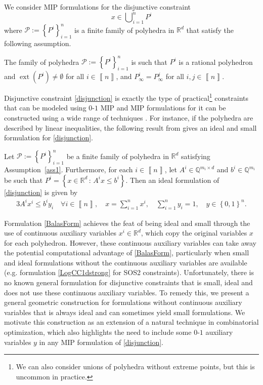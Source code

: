 \documentclass[mnsc]{informs3}
\newcommand{\set}[1]{\left\{#1\right\}}                     %
\newcommand{\bra}[1]{\left(#1\right)}
\newcommand{\sidx}[1]{\left\llbracket     #1 \right\rrbracket}
\newcommand{\Real}{\mathbb R}
\DeclareMathOperator{\ext}{ext}
\begin{document}
We consider MIP formulations for the disjunctive constraint \begin{equation}\label{disjunction}
x\in \bigcup\nolimits_{i=1}^n P^i
\end{equation}
where $\mathcal{P}:=\set{P^i}_{i=1}^n$ is a finite family of polyhedra in $\Real^d$ that satisfy the following assumption.
\begin{assumption}\label{ass1}The family of polyhedra $\mathcal{P}:=\set{P^i}_{i=1}^n$ is such that  $P^i$ is a rational polyhedron and $\ext\bra{P^i}\neq \emptyset$ for all $i\in \sidx{n}$, and 
 $P^i_\infty=P^j_\infty$ for all $i,j\in \sidx{n}$.
\end{assumption}
Disjunctive constraint \eqref{disjunction} is exactly the type of practical\footnote{We can also consider unions of polyhedra without extreme points, but this is uncommon in practice.} constraints that can be modeled using $0$-$1$ MIP \citep{springerlink:10.1007/BFb0121015} and MIP formulations for it can be constructed using a wide range of techniques \citep{Mixed-Integer-Linear-Programming-Formulation-Techniques}.
For instance, if the polyhedra are described by linear inequalities, the following result from \cite{springerlink:10.1007/BFb0121015,balas85} gives an ideal and small formulation for \eqref{disjunction}. 
\begin{theorem}\label{BTheo}  Let $\mathcal{P}:=\set{P^i}_{i=1}^n$ be a finite family of polyhedra in $\Real^d$ satisfying Assumption~\ref{ass1}. Furthermore, for each $i\in\sidx{n}$, let $A^i\in \mathbb{Q}^{m_i\times d}$ and $b^i\in \mathbb{Q}^{m_i}$ be such that $P^i=\set{x\in \Real^d\,:\, A^i x\leq b^i}$. Then an ideal formulation of \eqref{disjunction} is given by 
\begin{alignat}{3}\label{BalasForm}
A^i x^i\leq b^i y_i\quad\forall i\in \sidx{n},\quad x=\sum\nolimits_{i=1}^n x^i,\quad \sum\nolimits_{i=1}^n y_i=1,\quad y\in \set{0,1}^n.
\end{alignat}
\end{theorem}
Formulation \eqref{BalasForm} achieves the feat of being ideal and small through the use of continuous auxiliary variables $x^i\in \Real^d$, which copy the original variables $x$ for each polyhedron. However, these continuous auxiliary variables can take away the potential computational advantage of \eqref{BalasForm}, particularly when small and ideal formulations without the continuous auxiliary variables are available (e.g. formulation \eqref{LogCC1dstrong} for SOS2 constraints). Unfortunately, there is no known general  formulation for disjunctive constraints that is small, ideal and  does not use these continuous auxiliary variables. To remedy this, we  present a general geometric construction for formulations without continuous auxiliary variables that is always ideal and can sometimes yield small formulations. We motivate this construction as an extension of a natural technique in combinatorial optimization, which also highlights the need to include some $0$-$1$ auxiliary variables $y$ in any MIP formulation of \eqref{disjunction}.
\end{document}
